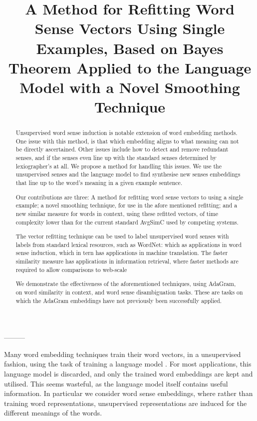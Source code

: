 \documentclass{sig-alternate}
\begin{document}
\title{A Method for Refitting Word Sense Vectors Using Single Examples, Based on Bayes Theorem Applied to the Language Model with a Novel Smoothing Technique}
\maketitle

\begin{abstract}
Unsupervised word sense induction is notable extension of word embedding methods.
One issue with this method, is that which embedding aligns to what meaning can not be directly ascertained. Other issues include how to detect and remove redundant senses,
and if the senses even line up with the standard senses determined by lexiographer's at all.
We propose a method for handling this issues.
We use the unsupervised senses and the language model to find synthesise new senses embeddings that line up to the word's meaning in a given example sentence.


Our contributions are three:
A method for refitting word sense vectors to using a single example;
a novel smoothing technique, for use in the afore mentioned refitting;
and a new similar measure for words in context, using these refitted vectors, of time complexity lower than for the current standard AvgSimC used by competing systems.

The vector refitting technique can be used to label unsupervised word senses with labels from standard lexical resources, such as WordNet: which as applications in word sense induction, which in tern has applications in machine translation.
The faster similarity measure has applications in information retrieval, where faster methods are required to allow comparisons to web-scale 


We demonstrate the effectiveness of the aforementioned techniques, using AdaGram\cite{AdaGrams}, on word similarity in context, and word sense disambiguation tasks. These are tasks on which the AdaGram embeddings have not previously been successfully applied.
\end{abstract}





---------

Many word embedding techniques train their word vectors, in a unsupervised fashion, using the task of training a language model \parencite{NPLM, collobert2008unified, mikolov2013efficient}.
For most applications, this language model is discarded, and only the trained word embeddings are kept and utilised.
This seems wasteful, as the language model itself contains useful information. In particular we consider word sense embeddings, where rather than training word representations, unsupervised representations are induced for the different meanings of the words.
\end{document}

